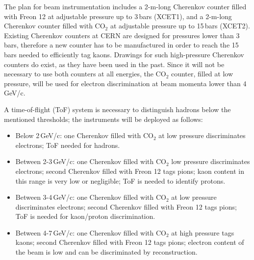 The %
plan for beam instrumentation includes a 2-m-long
Cherenkov  counter filled with Freon 12 at adjustable pressure up to
3\,bars (XCET1), and a  2-m-long  
 Cherenkov  counter filled with CO$_2$ at adjustable pressure up to
 15\,bars (XCET2).
Existing Cherenkov counters at CERN are designed for pressures lower than  3\,bars, therefore a new counter has to be manufactured in order to reach the 15\,bars needed to efficiently tag kaons. Drawings for such high-pressure Cherenkov counters do exist, as they have been %
used in the past. 
Since it will not be necessary to use both counters at all energies, the CO$_2$
counter, filled at low pressure,  will be used for electron discrimination at beam momenta lower
than 4\,GeV/c.  

A time-of-flight (ToF) system  is necessary to distinguish hadrons below the mentioned thresholds; the instruments will be deployed as follows:
%
\begin{itemize}
\item Below 2\,GeV/c: one Cherenkov filled with CO$_2$ at low
  pressure discriminates electrons; ToF needed for hadrons.
\item Between 2-3\,GeV/c: one Cherenkov filled with CO$_2$ low
  pressure discriminates electrons; second Cherenkov filled with
  Freon 12 tags pions; kaon content in this range is very low or negligible;
  ToF is needed to identify protons.
\item Between 3-4\,GeV/c: one Cherenkov filled with CO$_2$ at low
  pressure discriminates electrons; second  Cherenkov filled with
  Freon 12 tags pions; ToF is needed for kaon/proton discrimination.
\item Between 4-7\,GeV/c: one Cherenkov filled with CO$_2$ at high
  pressure tags kaons; second  Cherenkov filled with
  Freon 12 tags pions; electron content of the beam is low and can be
  discriminated by reconstruction.
\end{itemize}

